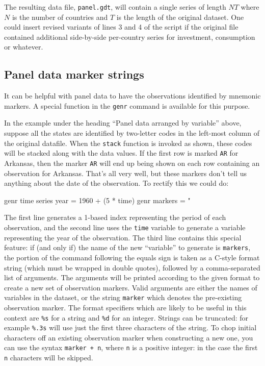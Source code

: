 The resulting data file, \texttt{panel.gdt}, will contain a single
series of length $NT$ where $N$ is the number of countries and
$T$ is the length of the original dataset. One could insert revised
variants of lines 3 and 4 of the script if the original file contained
additional side-by-side per-country series for investment, consumption
or whatever.

\subsection{Panel data marker strings}

It can be helpful with panel data to have the observations identified
by mnemonic markers.  A special function in the \texttt{genr} command
is available for this purpose.

In the example under the heading ``Panel data arranged by variable''
above, suppose all the states are identified by two-letter codes in
the left-most column of the original datafile.  When the
\texttt{stack} function is invoked as shown, these codes will be
stacked along with the data values.  If the first row is marked
\texttt{AR} for Arkansas, then the marker \texttt{AR} will end up
being shown on each row containing an observation for Arkansas.
That's all very well, but these markers don't tell us anything about
the date of the observation.  To rectify this we could do:

\begin{code}
genr time
series year = 1960 + (5 * time)
genr markers = "%
\end{code}

The first line generates a 1-based index representing the period of
each observation, and the second line uses the \texttt{time} variable
to generate a variable representing the year of the observation.  The
third line contains this special feature: if (and only if) the name of
the new ``variable'' to generate is \texttt{markers}, the portion of
the command following the equals sign is taken as a C-style format
string (which must be wrapped in double quotes), followed by a
comma-separated list of arguments.  The arguments will be printed
according to the given format to create a new set of observation
markers.  Valid arguments are either the names of variables in the
dataset, or the string \texttt{marker} which denotes the pre-existing
observation marker.  The format specifiers which are likely to be
useful in this context are \texttt{\%s} for a string and \texttt{\%d}
for an integer.  Strings can be truncated: for example \texttt{\%.3s}
will use just the first three characters of the string.  To chop
initial characters off an existing observation marker when
constructing a new one, you can use the syntax \texttt{marker + n},
where \texttt{n} is a positive integer: in the case the first
\texttt{n} characters will be skipped.

